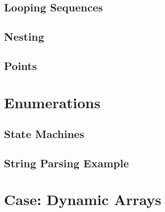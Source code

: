 \subsection{Looping Sequences}

\subsection{Nesting}

\subsection{Points}

\section{Enumerations}

\subsection{State Machines}

\subsection{String Parsing Example}

\section{Case: Dynamic Arrays}

